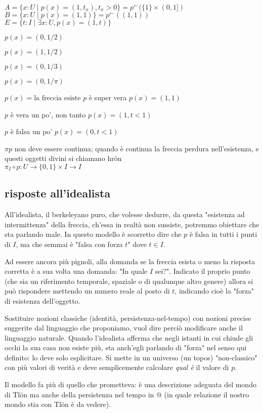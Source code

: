\documentclass[a4paper, 11pt]{article}
\begin{document}
$A = \{x : U \mid p(x) = (1,t_x), t_x > 0\} = p^\leftarrow(\{1\}\times (0,1])$ \\
$B = \{x : U \mid p(x) = (1,1)\} = p^\leftarrow((1,1))$ \\
$E = \{t : I \mid \exists x : U, p(x)=(1,t)\}$ 

$p(x) = (0,1/2)$

$p(x) = (1,1/2)$


$p(x) = (0,1/3)$

$p(x) = (0,1/\pi)$

$p(x) = \text{la freccia esiste}$
$p$ è super vera
$p(x)=(1,1)$

$p$ è vera un po', non tanto
$p(x) =(1,t<1)$

$p$ è falsa un po'
$p(x) =(0,t<1)$

$\pi p$ non deve essere continua; quando è continua la freccia perdura nell'esistenza, e questi oggetti divini si chiamano hrön \\
$\pi_I \circ p : U \to \{0,1\}\times I \to I$


\subsection{risposte all'idealista}
All'idealista, il berkeleyano puro, che volesse dedurre, da questa "esistenza ad intermittenza" della freccia, ch'essa in realtà non sussiste, potremmo obiettare che sta parlando male. In questo modello è scorretto dire che $p$ è falsa in tutti i punti di $I$, ma che semmai è "falsa con forza $t$" dove $t \in I$. 

Ad essere ancora più pignoli, alla domanda se la freccia esista o meno la risposta corretta è a sua volta una domanda: "In quale $I$ sei?". Indicato il proprio punto (che sia un riferimento temporale, spaziale o di qualunque altro genere) allora si può rispondere mettendo un numero reale al posto di $t$, indicando cioè la "forza" di esistenza dell'oggetto. 

Sostituire nozioni classiche (identità, persistenza-nel-tempo) con nozioni precise suggerite dal linguaggio che proponiamo, vuol dire perciò modificare anche il linguaggio naturale. Quando l'idealista afferma che negli istanti in cui chiude gli occhi la sua casa non esiste più, sta anch'egli parlando di "forza" nel senso qui definito: lo deve solo esplicitare. Si mette in un universo (un topos) "non-classico" con più valori di verità e deve semplicemente calcolare \emph{qual è} il valore di $p$. 

Il modello fa più di quello che prometteva: è una descrizione adeguata del mondo di Tl\"on ma anche della persistenza nel tempo in $@$ (in quale relazione il nostro mondo stia con Tl\"on è da vedere). 
\end{document}
